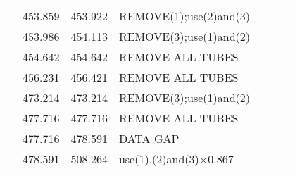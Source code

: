 \begin{table}[!h]
\begin{tabular}{ | c | c | c | p{5.5cm} | c | c | c |}
    &   453.859 &   453.922 &   REMOVE(1);use(2)and(3)  &       &       &       \\
    &   453.986 &   454.113 &   REMOVE(3);use(1)and(2)  &       &       &       \\
    &   454.642 &   454.642 &   REMOVE ALL TUBES    &       &       &       \\
    &   456.231 &   456.421 &   REMOVE ALL TUBES    &       &       &       \\
    &   473.214 &   473.214 &   REMOVE(3);use(1)and(2)  &       &       &       \\
    &   477.716 &   477.716 &   REMOVE ALL TUBES    &       &       &       \\
    &   477.716 &   478.591 &   DATA GAP    &       &       &       \\
    &   478.591 &   508.264 &   use(1),(2)and(3)$\times$0.867  &       &       &       \\
    \hline
    \end{tabular}
\end{table}

